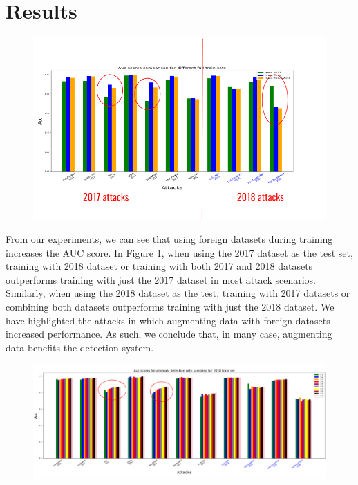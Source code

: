 \section{Results}

\begin{figure}[H]
    \centering
    \includegraphics[width=1\linewidth]{augment.png}
    \caption{}
\end{figure}

From our experiments, we can see that using foreign datasets during training increases the AUC score. In Figure 1, when using the 2017 dataset as the test set, training with 2018 dataset or training with both 2017 and 2018 datasets outperforms training with just the 2017 dataset in most attack scenarios. Similarly, when using the 2018 dataset as the test, training with 2017 datasets or combining both datasets outperforms training with just the 2018 dataset. We have highlighted the attacks in which augmenting data with foreign datasets increased performance. As such, we conclude that, in many case, augmenting data benefits the detection system.

\begin{figure}[H]
    \centering
    \includegraphics[width=1\linewidth]{amount.png}
    \caption{}
\end{figure}

